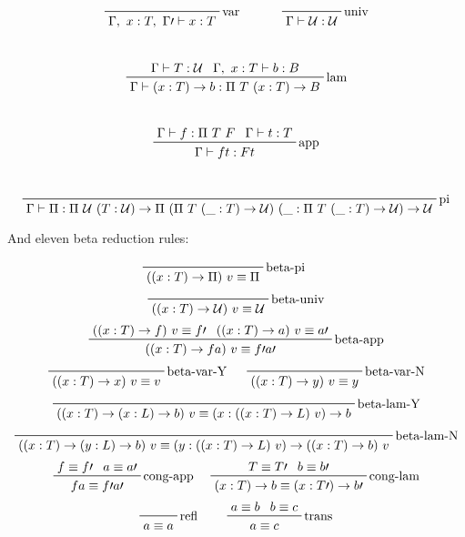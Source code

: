 \documentclass[11pt, twoside, reqno]{book}
\begin{document}
\begin{displaymath}
\prftree[r]{var}{\Gamma,\ x : T,\ \Gamma\prime \vdash x : T}\hspace{3em}\
\prftree[r]{univ}{\Gamma \vdash \mathcal{U} : \mathcal{U}}
\end{displaymath}\\
\begin{displaymath}
\prftree[r]{lam}{\Gamma \vdash T : \mathcal{U}}{\Gamma,\ x : T \vdash b : B}{\Gamma \vdash (x : T) \to b : \Pi\ T\ (x : T) \to B}
\end{displaymath}\\
\begin{displaymath}
\prftree[r]{app}{\Gamma \vdash f : \Pi\ T\ F}{\Gamma \vdash t : T}{\Gamma \vdash f t : F t}
\end{displaymath}\\
\begin{displaymath}
\prftree[r]{pi}{\Gamma \vdash \Pi : \Pi\ \mathcal{U}\ (T : \mathcal{U}) \to \Pi\ (\Pi\ T\ (\_ : T) \to \mathcal{U})\ (\_ : \Pi\ T\ (\_ : T) \to \mathcal{U}) \to \mathcal{U}}
\end{displaymath}

And eleven beta reduction rules:

\begin{displaymath}
\prftree[r]{beta-pi}{((x : T) \to \Pi)\ v \equiv \Pi}\hspace{2em}
\end{displaymath}
\begin{displaymath}
\prftree[r]{beta-univ}{((x : T) \to \mathcal{U})\ v \equiv \mathcal{U}}
\end{displaymath}
\begin{displaymath}
\prftree[r]{beta-app}{((x : T) \to f)\ v \equiv f\prime}{((x : T) \to a)\ v \equiv a\prime}{((x : T) \to f a)\ v \equiv f\prime a\prime}
\end{displaymath}
\begin{displaymath}
\prftree[r]{beta-var-Y}{((x : T) \to x)\ v \equiv v}\hspace{1.25em}\
\prftree[r]{beta-var-N}{((x : T) \to y)\ v \equiv y}
\end{displaymath}
\begin{displaymath}
\prftree[r]{beta-lam-Y}{((x : T) \to (x : L) \to b)\ v \equiv (x : ((x : T) \to L)\ v) \to b}
\end{displaymath}
\begin{displaymath}
\prftree[r]{beta-lam-N}{((x : T) \to (y : L) \to b)\ v \equiv (y : ((x : T) \to L)\ v) \to ((x : T) \to b)\ v}
\end{displaymath}
\begin{displaymath}
\prftree[r]{cong-app}{f \equiv f\prime}{a \equiv a\prime}{f a \equiv f\prime a\prime}\hspace{1em}\
\prftree[r]{cong-lam}{T \equiv T\prime}{b \equiv b\prime}{(x : T) \to b \equiv (x : T\prime) \to b\prime}
\end{displaymath}
\begin{displaymath}
\prftree[r]{refl}{a \equiv a}\hspace{1em}\hspace{1em}\
\prftree[r]{trans}{a \equiv b}{b \equiv c}{a \equiv c}
\end{displaymath}
\end{document}
